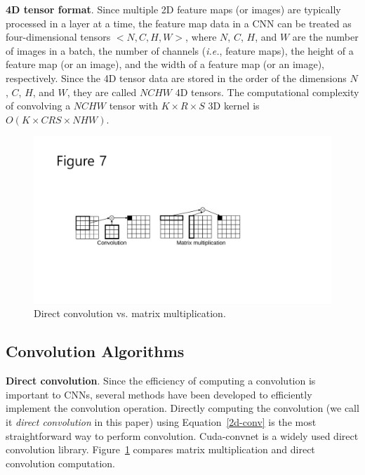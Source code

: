 {\bf 4D tensor format}. Since multiple 2D feature maps (or images) are typically processed in a layer at a time, the feature map data in a CNN can be treated as four-dimensional tensors $<N, C, H, W>$, where $N$, $C$, $H$, and $W$ are the number of images in a batch, the number of channels (\textit{i.e.}, feature maps), the height of a feature map (or an image), and the width of a feature map (or an image), respectively. Since the 4D tensor data are stored in the order of the dimensions $N$, $C$, $H$, and $W$, they are called $NCHW$ 4D tensors. The computational complexity of convolving a $NCHW$ tensor with $K \times R \times S$ 3D kernel is $O(K \times CRS \times NHW)$.

\begin{figure}[htbp]
  \centering
  \includegraphics[width=0.9\linewidth]{./figures/direct}
  \caption{Direct convolution vs. matrix multiplication.}
  \label{fig_direct}
\end{figure}

\subsection{Convolution Algorithms}
\label{sec:algorithms}
{\bf Direct convolution}. Since the efficiency of computing a convolution is important to CNNs, several methods have been developed to efficiently implement the convolution operation. Directly computing the convolution (we call it \textit{direct convolution} in this paper) using Equation~\ref{2d-conv} is the most straightforward way to perform convolution. Cuda-convnet\cite{cuda-convnet} is a widely used direct convolution library. Figure~\ref{fig_direct} compares matrix multiplication and direct convolution computation.

